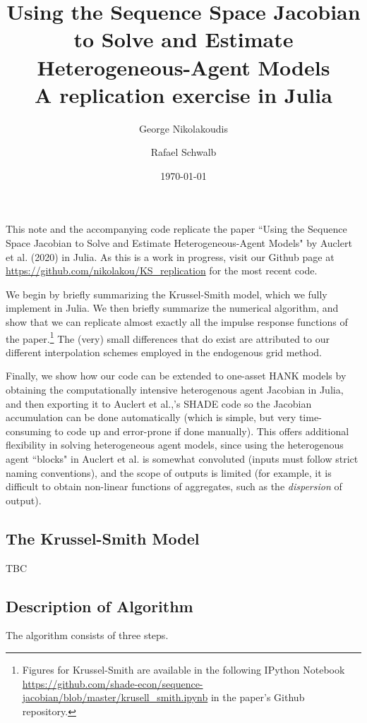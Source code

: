 \documentclass[10pt]{article} %
\title{Using the Sequence Space Jacobian to Solve and Estimate Heterogeneous-Agent Models \\
\vspace{1em} \large A replication exercise in Julia}
\author{George Nikolakoudis \and Rafael Schwalb}
\date{\today} %
\begin{document}
\maketitle
\nocite{*}

This note and the accompanying code replicate the paper ``Using the Sequence Space Jacobian to Solve and Estimate Heterogeneous-Agent Models" by Auclert et al. (2020) in Julia. As this is a work in progress, visit our Github page at \url{https://github.com/nikolakou/KS_replication} for the most recent code.

We begin by briefly summarizing the Krussel-Smith model, which we fully implement in Julia. We then briefly summarize the numerical algorithm, and show that we can replicate almost exactly all the impulse response functions of the paper.\footnote{Figures for Krussel-Smith are available in the following IPython Notebook \url{https://github.com/shade-econ/sequence-jacobian/blob/master/krusell_smith.ipynb} in the paper's Github repository.} The (very) small differences that do exist are attributed to our different interpolation schemes employed in the endogenous grid method.

Finally, we show how our code can be extended to one-asset HANK models by obtaining the computationally intensive heterogenous agent Jacobian in Julia, and then exporting it to Auclert et al.,'s SHADE code so the Jacobian accumulation can be done automatically (which is simple, but very time-consuming to code up and error-prone if done manually). This offers additional flexibility in solving heterogeneous agent models, since using the heterogenous agent ``blocks" in Auclert et al. is somewhat convoluted (inputs must follow strict naming conventions), and the scope of outputs is limited (for example, it is difficult to obtain non-linear functions of aggregates, such as the \emph{dispersion} of output).

\subsection*{The Krussel-Smith Model}

TBC

\subsection*{Description of Algorithm}

The algorithm consists of three steps.
\end{document}
